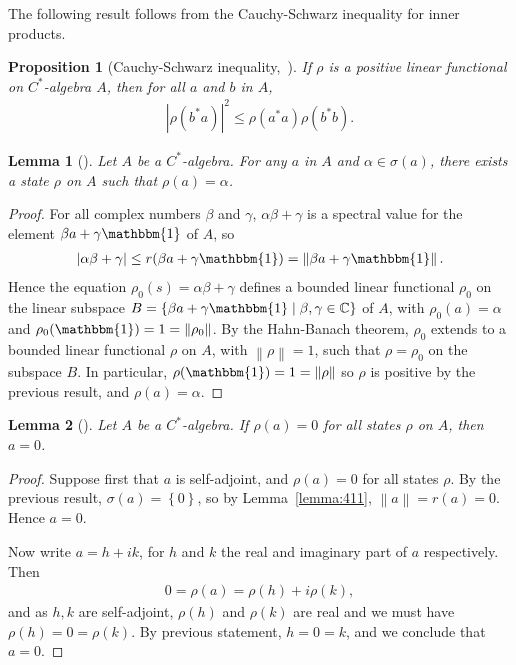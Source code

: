\documentclass[11pt,a4paper]{report}
\theoremstyle{plain}
\newtheorem{lemma}{Lemma}
\newtheorem*{prop*}{Proposition}
\theoremstyle{definition}
\newcommand{\1}{\mathbbm{1}}
\newcommand{\C}{\mathbb{C}}
\newcommand{\spec}[1]{\sigma(#1)}
\begin{document}
The following result follows from the Cauchy-Schwarz inequality for inner 
products.
\begin{prop*}[Cauchy-Schwarz inequality,~{\cite[4.3.1]{kadison83}}]
	If $\rho$ is a positive linear functional on $C^\ast$-algebra $A$, then for all 
	$a$ and $b$ in $A$,
	\begin{align*}
		|\rho(b^\ast a)|^2 \leq \rho(a^\ast a)\rho(b^\ast b).
	\end{align*}
\end{prop*}


\begin{lemma}[{\cite[4.3.3]{kadison83}}]\label{lemma:433}
	Let $A$ be a $C^\ast$-algebra. For any $a$ in $A$ and $\alpha\in\spec{a}$, there 
	exists a state $\rho$ on $A$ such that $\rho(a)=\alpha$.
\end{lemma}
\begin{proof}
	For all complex numbers $\beta$ and $\gamma$, $\alpha\beta+\gamma$ is a spectral 
	value for the element $\beta a+\gamma\1$ of $A$, so 
	\begin{align*}
		|\alpha\beta+\gamma|\leq r(\beta a+\gamma\1)=\left\|\beta a+\gamma\1\right\|.
	\end{align*} 
	Hence the equation $\rho_0(s)=\alpha\beta+\gamma$ defines a bounded linear 
	functional $\rho_0$ on the linear subspace $B= \left\{\beta a+\gamma\1 \mid 
	\beta,\gamma\in\C\right\}$ of $A$, with $\rho_0(a) =\alpha$ and 
	$\rho_0(\1)=1=\left\|\rho_0\right\|$. By the Hahn-Banach theorem, $\rho_0$ 
	extends to a bounded linear functional $\rho$ on $A$, with 
	$\left\|\rho\right\|=1$, such that $\rho=\rho_0$ on the subspace $B$. In 
	particular, $\rho(\1)=1=\left\|\rho\right\|$ so $\rho$ is positive by the 
	previous result, and $\rho(a)=\alpha$.
\end{proof}

\begin{lemma}[{\cite[4.3.4,(i)]{kadison83}}]\label{lemma:state1}
	Let $A$ be a $C^\ast$-algebra. If $\rho(a)=0$ for all states $\rho$ on $A$, 
	then $a=0$.
\end{lemma}
\begin{proof}
	Suppose first that $a$ is self-adjoint, and $\rho(a)=0$ for all states $\rho$. 
	By the previous result, $\spec{a}=\left\{0\right\}$, so by Lemma~\ref{lemma:411},
	$\left\|a\right\|=r(a)=0$. Hence $a=0$.

	Now write $a=h+ik$, for $h$ and $k$ the real and imaginary part of $a$ 
	respectively. Then
	\begin{align*}
		0=\rho(a)=\rho(h)+i\rho(k),
	\end{align*}
	and as $h,k$ are self-adjoint, $\rho(h)$ and $\rho(k)$ are real and we must have 
	$\rho(h)=0=\rho(k)$. By previous statement, $h=0=k$, and we conclude that $a=0$.
\end{proof}
\end{document}
